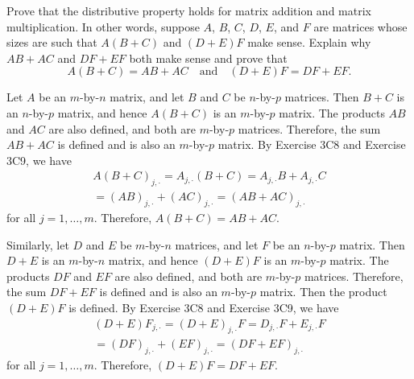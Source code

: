 \begin{exercise}
Prove that the distributive property holds for matrix addition and matrix
multiplication. In other words, suppose $A$, $B$, $C$, $D$, $E$, and $F$ are
matrices whose sizes are such that $A(B+C)$ and $(D+E)F$ make sense. Explain
why $AB+AC$ and $DF+EF$ both make sense and prove that
\[ A(B+C) = AB+AC \quad\text{and}\quad (D+E)F = DF+EF. \]
\end{exercise}
\begin{solution}
Let $A$ be an $m$-by-$n$ matrix, and let $B$ and $C$ be $n$-by-$p$ matrices.
Then $B+C$ is an $n$-by-$p$ matrix, and hence $A(B+C)$ is an $m$-by-$p$
matrix. The products $AB$ and $AC$ are also defined, and both are $m$-by-$p$
matrices. Therefore, the sum $AB+AC$ is defined and is also an $m$-by-$p$
matrix. By Exercise 3C8 and Exercise 3C9, we have
\begin{multline*}
A(B+C)_{j,\cdot} = A_{j,\cdot}(B+C) = A_{j,\cdot}B+A_{j,\cdot}C\\
  = (AB)_{j,\cdot}+(AC)_{j,\cdot} = (AB+AC)_{j,\cdot}
\end{multline*}
for all $j=1,\dots,m$. Therefore, $A(B+C)=AB+AC$.

Similarly, let $D$ and $E$ be $m$-by-$n$ matrices, and let $F$ be an $n$-by-$p$
matrix. Then $D+E$ is an $m$-by-$n$ matrix, and hence $(D+E)F$ is an
$m$-by-$p$ matrix. The products $DF$ and $EF$ are also defined, and both are
$m$-by-$p$ matrices. Therefore, the sum $DF+EF$ is defined and is also an
$m$-by-$p$ matrix. Then the product $(D+E)F$ is defined. By Exercise 3C8 and
Exercise 3C9, we have
\begin{multline*}
(D+E)F_{j,\cdot} = (D+E)_{j,\cdot}F = D_{j,\cdot}F+E_{j,\cdot}F\\
  = (DF)_{j,\cdot}+(EF)_{j,\cdot} = (DF+EF)_{j,\cdot}
\end{multline*}
for all $j=1,\dots,m$. Therefore, $(D+E)F=DF+EF$.
\end{solution}

